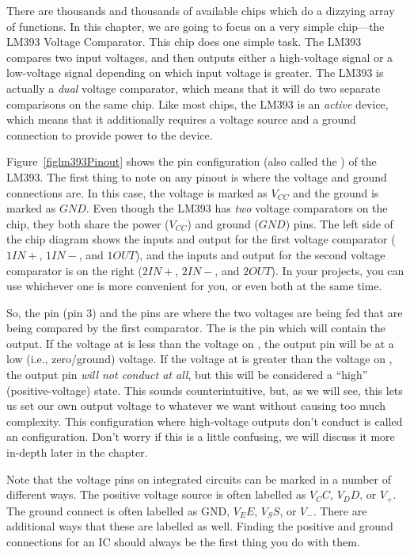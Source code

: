 There are thousands and thousands of available chips which do a dizzying array of functions.
In this chapter, we are going to focus on a very simple chip---the LM393 Voltage Comparator.
This chip does one simple task.
The LM393 compares two input voltages, and then outputs either a high-voltage signal or a low-voltage signal depending on which input voltage is greater.
The LM393 is actually a \emph{dual} voltage comparator, which means that it will do two separate comparisons on the same chip.
Like most chips, the LM393 is an \emph{active} device, which means that it additionally requires a voltage source and a ground connection to provide power to the device.


Figure~\ref{figlm393Pinout} shows the pin configuration (also called the ) of the LM393.
The first thing to note on any pinout is where the voltage and ground connections are.
In this case, the voltage is marked as $V_{CC}$ and the ground is marked as $GND$.
Even though the LM393 has \emph{two} voltage comparators on the chip, they both share the power ($V_{CC}$) and ground ($GND$) pins.
The left side of the chip diagram shows the inputs and output for the first voltage comparator ($1IN+$, $1IN-$, and $1OUT$), and the inputs and output for the second voltage comparator is on the right ($2IN+$, $2IN-$, and $2OUT$).
In your projects, you can use whichever one is more convenient for you, or even both at the same time.

So, the  pin (pin 3) and the  pins are where the two voltages are being fed that are being compared by the first comparator.
The  is the pin which will contain the output.
If the voltage at  is less than the voltage on , the output pin will be at a low (i.e., zero/ground) voltage.
If the voltage at  is greater than the voltage on , the output pin \emph{will not conduct at all}, but this will be considered a ``high'' (positive-voltage) state.
This sounds counterintuitive, but, as we will see, this lets us set our own output voltage to whatever we want without causing too much complexity.
This configuration where high-voltage outputs don't conduct is called an  configuration.
Don't worry if this is a little confusing, we will discuss it more in-depth later in the chapter.

\begin{sidebar}
Note that the voltage pins on integrated circuits can be marked in a number of different ways.
The positive voltage source is often labelled as $V_CC$, $V_DD$, or $V_+$.
The ground connect is often labelled as GND, $V_EE$, $V_SS$, or $V_-$.
There are additional ways that these are labelled as well.
Finding the positive and ground connections for an IC should always be the first thing you do with them.
\end{sidebar}

